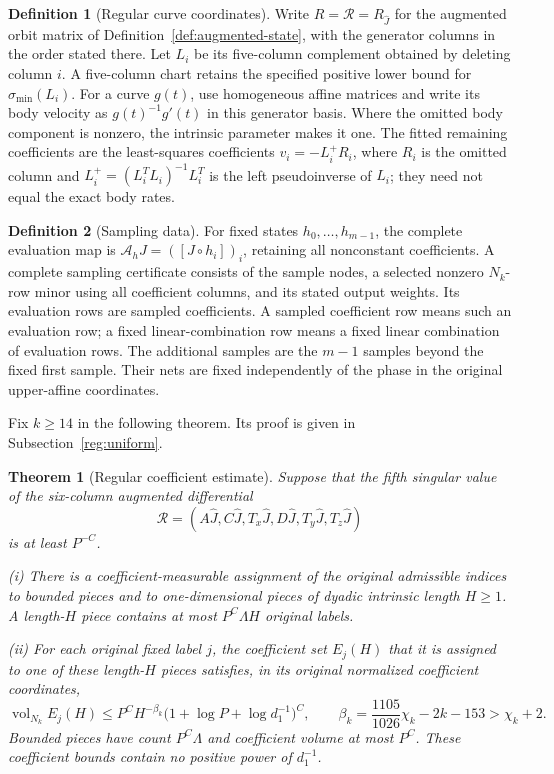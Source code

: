 \documentclass[11pt]{amsart}
\newtheorem{theorem}{Theorem}[section]
\theoremstyle{definition}
\newtheorem{definition}{Definition}[section]
\theoremstyle{remark}
\numberwithin{equation}{section}
\begin{document}
\begin{definition}[Regular curve coordinates]\label{def:regular-coordinates}
Write $R=\mathcal R=R_{\widehat J}$ for the augmented orbit matrix of Definition~\ref{def:augmented-state}, with the generator columns in the order stated there. Let $L_i$ be its five-column complement obtained by deleting column $i$. A five-column chart retains the specified positive lower bound for $\sigma_{\min}(L_i)$. For a curve $g(t)$, use homogeneous affine matrices and write its body velocity as $g(t)^{-1}g'(t)$ in this generator basis. Where the omitted body component is nonzero, the intrinsic parameter makes it one. The fitted remaining coefficients are the least-squares coefficients $v_i=-L_i^+R_i$, where $R_i$ is the omitted column and $L_i^+=(L_i^TL_i)^{-1}L_i^T$ is the left pseudoinverse of $L_i$; they need not equal the exact body rates.
\end{definition}
\begin{definition}[Sampling data]\label{def:sampling}
For fixed states $h_0,\ldots,h_{m-1}$, the complete evaluation map is $\mathcal A_hJ=([J\circ h_i])_i$, retaining all nonconstant coefficients. A complete sampling certificate consists of the sample nodes, a selected nonzero $N_k$-row minor using all coefficient columns, and its stated output weights. Its evaluation rows are sampled coefficients. A sampled coefficient row means such an evaluation row; a fixed linear-combination row means a fixed linear combination of evaluation rows. The additional samples are the $m-1$ samples beyond the fixed first sample. Their nets are fixed independently of the phase in the original upper-affine coordinates.
\end{definition}
Fix $k\ge14$ in the following theorem. Its proof is given in Subsection~\ref{reg:uniform}.

\begin{theorem}[Regular coefficient estimate]\label{reg:regular-tail}
Suppose that the fifth singular value of the six-column augmented differential
\[
\mathcal R=(A\widehat J,C\widehat J,T_x\widehat J,D\widehat J,T_y\widehat J,T_z\widehat J)
\]
is at least $P^{-C}$.

\noindent\textup{(i)} There is a coefficient-measurable assignment of the original admissible indices to bounded pieces and to one-dimensional pieces of dyadic intrinsic length $H\ge1$. A length-$H$ piece contains at most $P^C\Lambda H$ original labels.

\noindent\textup{(ii)} For each original fixed label $j$, the coefficient set $E_j(H)$ that it is assigned to one of these length-$H$ pieces satisfies, in its original normalized coefficient coordinates,
\begin{equation}\label{reg:tail}
\operatorname{vol}_{N_k} E_j(H)\le P^C H^{-\beta_k}\bigl(1+\log P+\log d_1^{-1}\bigr)^C,\qquad \beta_k=\frac{1105}{1026}\chi_k-2k-153>\chi_k+2.
\end{equation}
Bounded pieces have count $P^C\Lambda$ and coefficient volume at most $P^C$. These coefficient bounds contain no positive power of $d_1^{-1}$.
\end{theorem}
\end{document}
